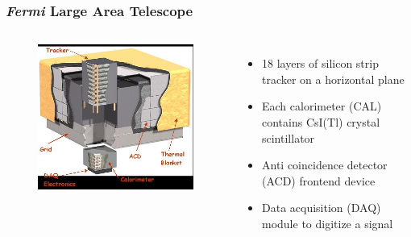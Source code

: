\documentclass{beamer}
\begin{document}
\begin{frame}
\frametitle{\textit{Fermi} Large Area Telescope}
\begin{columns}

  \centering
  \begin{figure}[h!]
  \includegraphics[width = \textwidth]{img/LATStructure}
  \end{figure}

  \begin{itemize}
  \item 18 layers of silicon strip tracker on a horizontal plane
  \item Each calorimeter (CAL) contains CsI(Tl) crystal scintillator
  \item Anti coincidence detector (ACD) frontend device
  \item Data acquisition (DAQ) module to digitize a signal
  \end{itemize}
\end{columns}
\end{frame}
\end{document}
